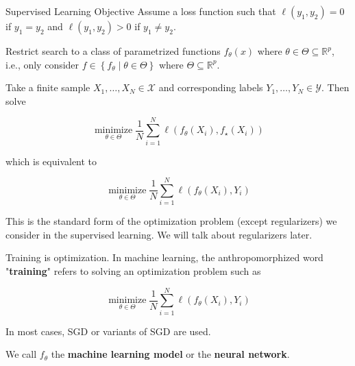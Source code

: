 \begin{frame}[allowframebreaks]

\begin{mydefinitionblock}{3.2}{Supervised Learning Objective}
    Assume a loss function such that $\ell\left(y_{1}, y_{2}\right)=0$ if $y_{1}=y_{2}$ and $\ell\left(y_{1}, y_{2}\right)>0$ if $y_{1} \neq y_{2}$.

    Restrict search to a class of parametrized functions $f_{\theta}(x)$ where $\theta \in \Theta \subseteq \mathbb{R}^{p}$, i.e., only consider $f \in\left\{f_{\theta} \mid \theta \in \Theta\right\}$ where $\Theta \subseteq \mathbb{R}^{p}$.

    Take a finite sample $X_{1}, \ldots, X_{N} \in \mathcal{X}$ and corresponding labels $Y_{1}, \ldots, Y_{N} \in \mathcal{Y}$. Then solve

    $$
    \underset{\theta \in \Theta}{\operatorname{minimize}} \frac{1}{N} \sum_{i=1}^{N} \ell\left(f_{\theta}\left(X_{i}\right), f_{\star}\left(X_{i}\right)\right)
    $$

    which is equivalent to

    $$
    \underset{\theta \in \Theta}{\operatorname{minimize}} \frac{1}{N} \sum_{i=1}^{N} \ell\left(f_{\theta}\left(X_{i}\right), Y_{i}\right)
    $$

    This is the standard form of the optimization problem (except regularizers) we consider in the supervised learning. We will talk about regularizers later.
\end{mydefinitionblock}

\end{frame}

\begin{frame}[allowframebreaks]

\begin{myconceptblock}{3.3}{Training is optimization.}
    In machine learning, the anthropomorphized word "\textbf{training}" refers to solving an optimization problem such as

    $$
    \underset{\theta \in \Theta}{\operatorname{minimize}} \frac{1}{N} \sum_{i=1}^{N} \ell\left(f_{\theta}\left(X_{i}\right), Y_{i}\right)
    $$

    In most cases, SGD or variants of SGD are used.

    We call $f_{\theta}$ the \textbf{machine learning model} or the \textbf{neural network}.
\end{myconceptblock}

\end{frame}

